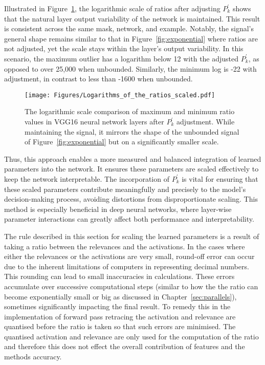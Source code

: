 Illustrated in Figure~\ref{fig:scaled}, the logarithmic scale of ratios after adjusting \(P_{k}^\prime\) shows that the natural layer output variability of the network is maintained. This result is consistent across the same mask, network, and example. Notably, the signal's general shape remains similar to that in Figure~\ref{fig:exponential} where ratios are not adjusted, yet the scale stays within the layer’s output variability. In this scenario, the maximum outlier has a logarithm below 12 with the adjusted \(P_{k}^\prime\), as opposed to over 25,000 when unbounded. Similarly, the minimum log is -22 with adjustment, in contrast to less than -1600 when unbounded.

\begin{figure}[ht!]
	\begin{center}
		\texttt{[image: Figures/Logarithms\_of\_the\_ratios\_scaled.pdf]}
	\end{center}
	\caption{The logarithmic scale comparison of maximum and minimum ratio values in VGG16 neural network layers after \(P_{k}^\prime\) adjustment. While maintaining the signal, it mirrors the shape of the unbounded signal of Figure~\ref{fig:exponential}  but on a significantly smaller scale.}
	\label{fig:scaled}
\end{figure}

Thus, this approach enables a more measured and balanced integration of learned parameters into the network. It ensures these parameters are scaled effectively to keep the network interpretable. The incorporation of \(P_{k}^\prime\) is vital for ensuring that these scaled parameters contribute meaningfully and precisely to the model's decision-making process, avoiding distortions from disproportionate scaling. This method is especially beneficial in deep neural networks, where layer-wise parameter interactions can greatly affect both performance and interpretability.

The rule described in this section for scaling the learned parameters is a result of taking a ratio between the relevances and the activations. In the cases where either the relevances or the activations are very small, round-off error can occur due to the inherent limitations of computers in representing decimal numbers. This rounding can lead to small inaccuracies in calculations. These errors accumulate over successive computational steps (similar to how the the ratio can become exponentially small or big as discussed in Chapter~\ref{sec:parallels}), sometimes significantly impacting the final result. To remedy this in the implementation of forward pass retracing the activation and relevance are quantised before the ratio is taken so that such errors are minimised. The quantised activation and relevance are only used for the computation of the ratio and therefore this does not effect the overall contribution of features and the methods accuracy.


